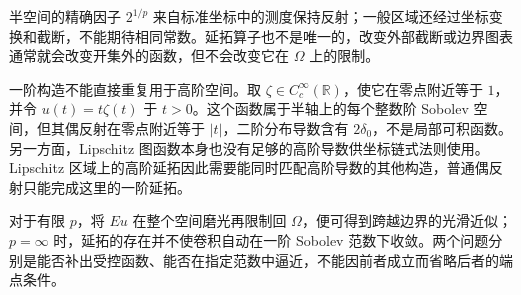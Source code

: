 半空间的精确因子 \(2^{1/p}\) 来自标准坐标中的测度保持反射；一般区域还经过坐标变换和截断，不能期待相同常数。延拓算子也不是唯一的，改变外部截断或边界图表通常就会改变开集外的函数，但不会改变它在 \(\Omega\) 上的限制。

\ProseParagraphBreak

一阶构造不能直接重复用于高阶空间。取 \(\zeta\in C_c^\infty(\mathbb R)\)，使它在零点附近等于 \(1\)，并令 \(u(t)=t\zeta(t)\) 于 \(t>0\)。这个函数属于半轴上的每个整数阶 Sobolev 空间，但其偶反射在零点附近等于 \(|t|\)，二阶分布导数含有 \(2\delta_0\)，不是局部可积函数。另一方面，Lipschitz 图函数本身也没有足够的高阶导数供坐标链式法则使用。Lipschitz 区域上的高阶延拓因此需要能同时匹配高阶导数的其他构造，普通偶反射只能完成这里的一阶延拓。

\ProseParagraphBreak

对于有限 \(p\)，将 \(Eu\) 在整个空间磨光再限制回 \(\Omega\)，便可得到跨越边界的光滑近似；\(p=\infty\) 时，延拓的存在并不使卷积自动在一阶 Sobolev 范数下收敛。两个问题分别是能否补出受控函数、能否在指定范数中逼近，不能因前者成立而省略后者的端点条件。
